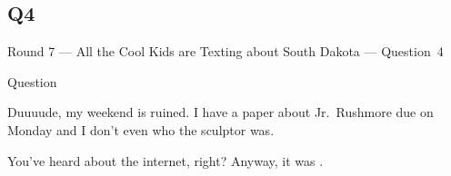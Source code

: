 \documentclass[11pt]{beamer}
\begin{document}
\subsection*{Q4}
\begin{frame}[t]{Round 7 --- All the Cool Kids are Texting about South Dakota --- \mbox{Question 4}}
\begin{block}{Question}

\begin{minipage}{0.9\textwidth}
\begin{mdframed}[
    roundcorner=7pt,
    backgroundcolor=black!5,
    linecolor=black!5,
    fontcolor=black,
    ignorelastdescenders]
\begin{flushleft}
{\small{}\selectfont{}
Duuuude, my weekend is ruined.  I have a paper about Jr.\ Rushmore due on Monday and I don't even who the sculptor was.
}
\end{flushleft}
\end{mdframed}
\end{minipage}

\hfill{}\begin{minipage}{0.9\textwidth}
\begin{mdframed}[
    roundcorner=7pt,
    backgroundcolor=blue!80!white,
    linecolor=blue!80!white,
    fontcolor=white,
    ignorelastdescenders]
\begin{flushleft}
{\small{}\selectfont{}
You've heard about the internet, right? Anyway, it was \textunderscore{}\textunderscore{}\textunderscore{}\textunderscore{}\textunderscore{}\textunderscore{} \textunderscore{}\textunderscore{}\textunderscore{}\textunderscore{}\textunderscore{}\textunderscore{}.
}
\end{flushleft}
\end{mdframed}
\end{minipage}
\end{block}
\end{frame}
\end{document}
